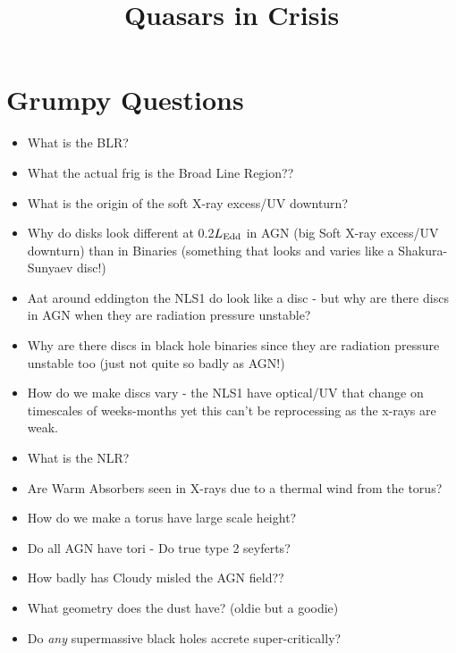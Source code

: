 \documentclass[11pt,a4paper]{article}
\begin{document}
\title{Quasars in Crisis}
\maketitle


\section*{Grumpy Questions}


\begin{itemize}
\item What is the BLR?
\item What the actual frig is the Broad Line Region??

\item What is the origin of the soft X-ray excess/UV downturn? 

\item Why do disks look different at 0.2$L_{\rm Edd}$ in AGN (big Soft X-ray excess/UV downturn) than in Binaries (something that looks and varies like a Shakura-Sunyaev disc!) 

\item Aat around eddington the NLS1 do look like a disc - but why are there discs in AGN when 
they are radiation pressure unstable?

\item Why are there discs in  black hole binaries since they are radiation pressure unstable too (just not quite so badly as AGN!)

\item How do we make discs vary - the NLS1 have optical/UV that change on timescales of weeks-months yet this can't be reprocessing as the x-rays are weak.

\item What is the NLR? 

\item Are Warm Absorbers seen in X-rays due to a thermal wind from the torus? 

\item How do we make a torus have large scale height?
\item Do all AGN have tori - Do true type 2 seyferts?

\item How badly has Cloudy misled the AGN field??

\item What geometry does the dust have? (oldie but a goodie)

\item Do {\it any} supermassive black holes accrete super-critically?


\end{itemize}
\end{document}
